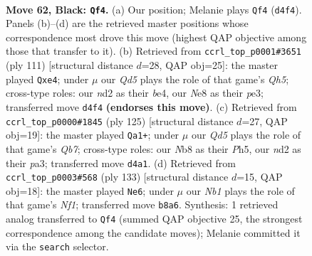 \documentclass[11pt]{article}
\begin{document}
\clearpage

\begin{figure}[p]\centering
\begin{subfigure}{0.46\textwidth}\centering
\resizebox{\linewidth}{!}{%
\newchessgame
\chessboard[
  setfen={1n1kn3/1Q6/8/7K/P2q4/8/3N4/8 b - - 8 62},
  showmover=false,
  pgfstyle=straightmove, color=movearrow, markmove={d4-f4}
]}
\caption{}
\end{subfigure}\hfill
\begin{subfigure}{0.46\textwidth}\centering
\resizebox{\linewidth}{!}{%
\newchessgame
\chessboard[
  setfen={8/6k1/3Q4/4n3/4B2q/4P3/8/3K4 b - - 2 56},
  showmover=false,
  pgfstyle=straightmove, color=movearrow, markmove={h4-e4}
]}
\caption{}
\end{subfigure}
\\[4pt]
\begin{subfigure}{0.46\textwidth}\centering
\resizebox{\linewidth}{!}{%
\newchessgame
\chessboard[
  setfen={7k/8/6Q1/7p/1P6/P7/1q6/6K1 b - - 6 63},
  showmover=false,
  pgfstyle=straightmove, color=movearrow, markmove={b2-a1}
]}
\caption{}
\end{subfigure}\hfill
\begin{subfigure}{0.46\textwidth}\centering
\resizebox{\linewidth}{!}{%
\newchessgame
\chessboard[
  setfen={5nk1/8/8/3q3P/5Q2/7K/6N1/8 b - - 0 67},
  showmover=false,
  pgfstyle=straightmove, color=movearrow, markmove={f8-e6}
]}
\caption{}
\end{subfigure}
\caption{\textbf{Move 62, Black: \texttt{Qf4}.} (a) Our position; Melanie plays \texttt{Qf4} (\texttt{d4f4}). Panels (b)--(d) are the retrieved master positions whose correspondence most drove this move (highest QAP objective among those that transfer to it). (b) Retrieved from \texttt{ccrl\_top\_p0001\#3651} (ply 111) [structural distance $d$=28, QAP obj=25]: the master played \texttt{Qxe4}; under $\mu$ our \emph{Qd5} plays the role of that game's \emph{Qh5}; cross-type roles: our \emph{n}d2 as their \emph{b}e4, our \emph{N}e8 as their \emph{p}e3; transferred move \texttt{d4f4} \textbf{(endorses this move)}. (c) Retrieved from \texttt{ccrl\_top\_p0000\#1845} (ply 125) [structural distance $d$=27, QAP obj=19]: the master played \texttt{Qa1+}; under $\mu$ our \emph{Qd5} plays the role of that game's \emph{Qb7}; cross-type roles: our \emph{N}b8 as their \emph{P}h5, our \emph{n}d2 as their \emph{p}a3; transferred move \texttt{d4a1}. (d) Retrieved from \texttt{ccrl\_top\_p0003\#568} (ply 133) [structural distance $d$=15, QAP obj=18]: the master played \texttt{Ne6}; under $\mu$ our \emph{Nb1} plays the role of that game's \emph{Nf1}; transferred move \texttt{b8a6}. Synthesis: 1 retrieved analog transferred to \texttt{Qf4} (summed QAP objective 25, the strongest correspondence among the candidate moves); Melanie committed it via the \texttt{search} selector.}
\label{fig:thought-m123}
\end{figure}
\end{document}
